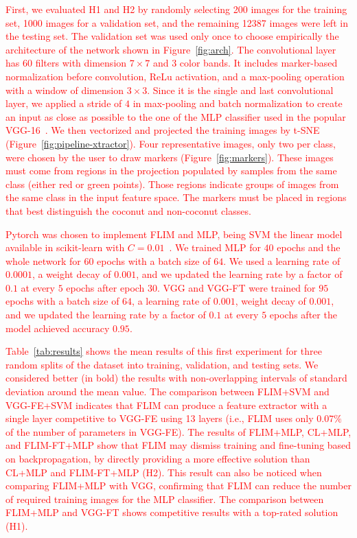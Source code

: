 \documentclass[journal, twoside]{IEEEtran}
\begin{document}
\textcolor{red}{First, we evaluated H1 and H2 by randomly selecting 200 images for the training set, 1000 images for a validation set, and the remaining 12387 images were left in the testing set. The validation set was used only once to choose empirically the architecture of the network shown in Figure~\ref{fig:arch}. The convolutional layer has $60$ filters with dimension $7 \times 7$ and 3 color \textcolor{red}{bands}. It includes marker-based normalization before convolution, ReLu activation, and a max-pooling operation with a window of dimension $3 \times 3$. Since it is the single and last convolutional layer, we applied a stride of $4$ in max-pooling and batch normalization to create an input as close as possible to the one of the \textcolor{red}{MLP} classifier used in the popular VGG-16~\cite{simonyan2014very}. We then vectorized and projected the training images by t-SNE~\cite{maaten2008visualizing} (Figure~\ref{fig:pipeline-xtractor}). Four representative images, only two per class, were chosen by the user to draw markers (Figure~\ref{fig:markers}). These images must come from regions in the projection populated by samples from the same class (either red or green points). Those regions indicate groups of images from the same class in the input feature space. The markers must be placed in regions that best distinguish the coconut and non-coconut classes.}

\textcolor{red}{Pytorch was chosen to implement FLIM and MLP, being SVM the linear model available in scikit-learn with $C=0.01$~\cite{fan2008liblinear, scikit-learn}. We trained MLP for $40$ epochs and the whole network for $60$ epochs with a batch size of $64$. We used a learning rate of $0.0001$, a weight decay of $0.001$, and we updated the learning rate by a factor of $0.1$ at every $5$ epochs after epoch 30. VGG and VGG-FT were trained for $95$ epochs with a batch size of $64$, a learning rate of $0.001$, weight decay of $0.001$, and we updated the learning rate by a factor of $0.1$ at every $5$ epochs after the model achieved accuracy $0.95$.}

\textcolor{red}{
Table~\ref{tab:results} shows the mean results of this first experiment for three random splits of the dataset into training, validation, and testing sets. We considered better (in bold) the results with non-overlapping intervals of standard deviation around the mean value. The comparison between FLIM+SVM and VGG-FE+SVM indicates that FLIM can produce a feature extractor with a single layer competitive to VGG-FE using 13 layers (i.e., FLIM uses only $0.07\%$ of the number of parameters in VGG-FE). The results of FLIM+MLP, CL+MLP, and FLIM-FT+MLP show that FLIM may dismiss training and fine-tuning based on backpropagation, by directly providing a more effective solution than CL+MLP and FLIM-FT+MLP (H2). This result can also be noticed when comparing  FLIM+MLP with VGG, confirming that FLIM can reduce the number of required training images for the MLP classifier. The comparison between FLIM+MLP and VGG-FT shows competitive results with a top-rated solution (H1).}
\end{document}
